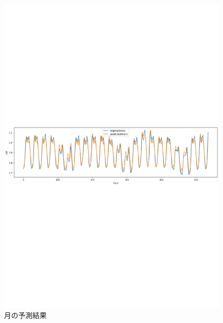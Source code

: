 \begin{figure}[phb]
\begin{center}
\includegraphics[scale=0.8]{lstm_pred_month.pdf}
 \caption{月の予測結果}
\end{center}
\end{figure}

